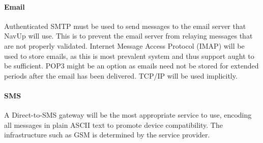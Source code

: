 \paragraph{Email}
Authenticated SMTP must be used to send messages to the email server that NavUp will use. This is to prevent the email server from relaying messages that are not properly validated. Internet Message Access Protocol (IMAP) will be used to store emails, as this is most prevalent system and thus support aught to be sufficient. POP3 might be an option as emails need not be stored for extended periods after the email has been delivered. TCP/IP will be used implicitly.

\paragraph{SMS}
A Direct-to-SMS gateway will be the most appropriate service to use, encoding all messages in plain ASCII text to promote device compatibility. The infrastructure such as GSM is determined by the service provider.